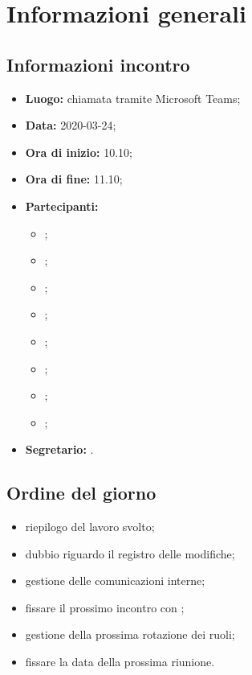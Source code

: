 \section{Informazioni generali}
\subsection{Informazioni incontro}
\begin{itemize}
	\item \textbf{Luogo:} chiamata tramite Microsoft Teams; 
	\item \textbf{Data:} 2020-03-24;
	\item \textbf{Ora di inizio:} 10.10; 
	\item \textbf{Ora di fine:} 11.10; 
	\item \textbf{Partecipanti:}
		\begin{itemize}
			\item \VB; 
			\item \LB; 
			\item \NF; 
			\item \EG; 
			\item \FJ; 
			\item \MP; 
			\item \AS; 
			\item \AZ; 
		\end{itemize}
	\item \textbf{Segretario:} \MP. 
\end{itemize}

\subsection{Ordine del giorno}
\begin{itemize}
	\item riepilogo del lavoro svolto;
	\item dubbio riguardo il registro delle modifiche;
	\item gestione delle comunicazioni interne;
	\item fissare il prossimo incontro con \Proponente{};
	\item gestione della prossima rotazione dei ruoli;
	\item fissare la data della prossima riunione.
\end{itemize}
